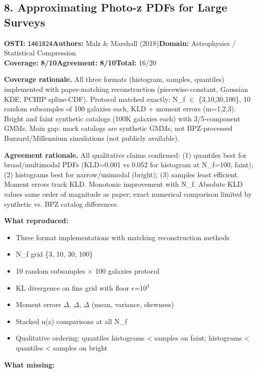 \documentclass[11pt]{article}
\newcommand{\scorebadge}[2]{\textbf{#1:} \textbf{#2/10}}
\begin{document}
\subsection{8. Approximating Photo-z PDFs for Large Surveys}
\textbf{OSTI:} \texttt{1461824}\quad\textbf{Authors:} Malz \& Marshall (2018)\quad\textbf{Domain:} Astrophysics / Statistical Compression\\
\scorebadge{Coverage}{8}\quad\scorebadge{Agreement}{8}\quad\textbf{Total:} 16/20\par\smallskip
\noindent\textbf{Coverage rationale.} All three formats (histogram, samples, quantiles) implemented with paper-matching reconstruction (piecewise-constant, Gaussian KDE, PCHIP spline-CDF). Protocol matched exactly: N\_f $\in$ \{3,10,30,100\}, 10 random subsamples of 100 galaxies each, KLD + moment errors (m=1,2,3). Bright and faint synthetic catalogs (100K galaxies each) with 3/5-component GMMs. Main gap: mock catalogs are synthetic GMMs, not BPZ-processed Buzzard/Millennium simulations (not publicly available).\par
\noindent\textbf{Agreement rationale.} All qualitative claims confirmed: (1) quantiles best for broad/multimodal PDFs (KLD=0.001 vs 0.052 for histogram at N\_f=100, faint); (2) histograms best for narrow/unimodal (bright); (3) samples least efficient. Moment errors track KLD. Monotonic improvement with N\_f. Absolute KLD values same order of magnitude as paper; exact numerical comparison limited by synthetic vs. BPZ catalog differences.\par\smallskip
\noindent\textbf{What reproduced:}
\begin{itemize}[leftmargin=1.4em,itemsep=0.2em,topsep=0.2em]
\item Three format implementations with matching reconstruction methods
\item N\_f grid \{3, 10, 30, 100\}
\item 10 random subsamples $\times$ 100 galaxies protocol
\item KL divergence on fine grid with floor $\epsilon$=10$^3$
\item Moment errors $\Delta$, $\Delta$, $\Delta$ (mean, variance, skewness)
\item Stacked n(z) comparisons at all N\_f
\item Qualitative ordering: quantiles  histograms \textless{} samples on faint; histograms \textless{} quantiles \textless{} samples on bright
\end{itemize}\noindent\textbf{What missing:}
\end{document}

